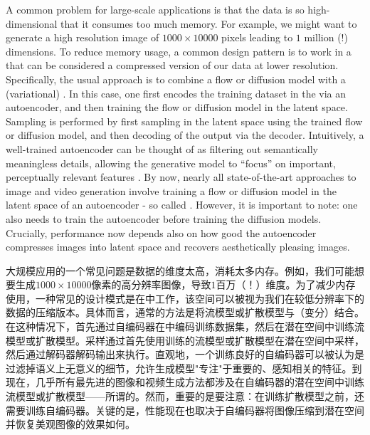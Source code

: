 \begin{remarkbox}
A common problem for large-scale applications is that the data is so high-dimensional that it consumes too much memory. For example, we might want to generate a high resolution image of $1000\times 10000$ pixels leading to $1$ million (!) dimensions. To reduce memory usage, a common design pattern is to work in a  that can be considered a compressed version of our data at lower resolution.  Specifically, the usual approach is to combine a flow or diffusion model with a (variational)  \cite{latent_diffusion}. In this case, one first encodes the training dataset in the  via an autoencoder, and then training the flow or diffusion model in the latent space. Sampling is performed by first sampling in the latent space using the trained flow or diffusion model, and then decoding of the output via the decoder. Intuitively, a well-trained autoencoder can be thought of as filtering out semantically meaningless details, allowing the generative model to ``focus'' on important, perceptually relevant features \cite{latent_diffusion}. By now, nearly all state-of-the-art approaches to image and video generation involve training a flow or diffusion model in the latent space of an autoencoder - so called  \citep{latent_diffusion,vahdat2021score}. However, it is important to note: one also needs to train the autoencoder before training the diffusion models. Crucially, performance now depends also on how good the autoencoder compresses images into latent space and recovers aesthetically pleasing images.

大规模应用的一个常见问题是数据的维度太高，消耗太多内存。例如，我们可能想要生成$1000\times 10000$像素的高分辨率图像，导致$1$百万（！）维度。为了减少内存使用，一种常见的设计模式是在中工作，该空间可以被视为我们在较低分辨率下的数据的压缩版本。具体而言，通常的方法是将流模型或扩散模型与（变分）结合\cite{latent_diffusion}。在这种情况下，首先通过自编码器在中编码训练数据集，然后在潜在空间中训练流模型或扩散模型。采样通过首先使用训练的流模型或扩散模型在潜在空间中采样，然后通过解码器解码输出来执行。直观地，一个训练良好的自编码器可以被认为是过滤掉语义上无意义的细节，允许生成模型"专注"于重要的、感知相关的特征\cite{latent_diffusion}。到现在，几乎所有最先进的图像和视频生成方法都涉及在自编码器的潜在空间中训练流模型或扩散模型——所谓的\citep{latent_diffusion,vahdat2021score}。然而，重要的是要注意：在训练扩散模型之前，还需要训练自编码器。关键的是，性能现在也取决于自编码器将图像压缩到潜在空间并恢复美观图像的效果如何。
\end{remarkbox}

